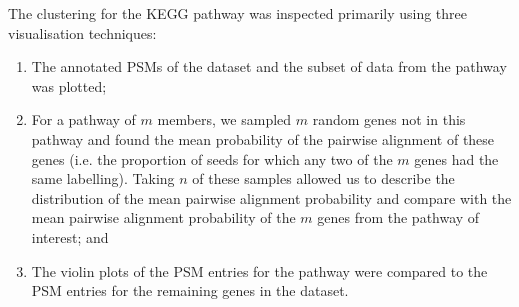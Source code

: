 \documentclass[12pt]{article} %
\begin{document}
	\newpage
	
%
%
		
	\newpage
	
	The clustering for the KEGG pathway was inspected primarily using three visualisation techniques:
	\begin{enumerate}
		\item The annotated PSMs of the dataset and the subset of data from the pathway was plotted;
		\item For a pathway of $m$ members, we sampled $m$ random genes not in this pathway and found the mean probability of the pairwise alignment of these genes (i.e. the proportion of seeds for which any two of the $m$ genes had the same labelling). Taking $n$ of these samples allowed us to describe the distribution of the mean pairwise alignment probability and compare with the mean pairwise alignment probability of the $m$ genes from the pathway of interest; and
		\item The violin plots of the PSM entries for the pathway were compared to the PSM entries for the remaining genes in the dataset.
	\end{enumerate}
	
		\newpage
	
\end{document}

